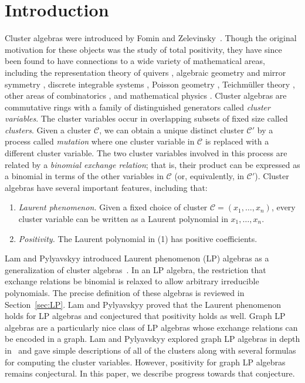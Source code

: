 \documentclass[pdftex]{sigma}
\numberwithin{equation}{section}
\newcommand{\calC}{\mathcal{C}}
\begin{document}
\section{Introduction}\label{sec:intro}
Cluster algebras were introduced by Fomin and Zelevinsky~\cite{FZ-02}. Though the original motivation for these objects was the study of total positivity, they have since been found to have connections to a wide variety of mathematical areas, including the representation theory of quivers \cite{BMRRT-06, K-10, R-10}, algebraic geometry and mirror symmetry \cite{B-17,GHK-15}, discrete integrable systems \cite{FH-13, K-10-II}, Poisson geometry \cite{GSV-05,GSV-10}, Teichm\"uller theory \cite{FG-09, FG-10, FT-18, GSV-05}, other areas of combinatorics \cite{BMDKTY-18,C-04, CFZ-02,IT-09}, and mathematical physics \cite{C-04,F-12}.
Cluster algebras are commutative rings with a family of distinguished generators called \emph{cluster variables}. The cluster variables occur in overlapping subsets of fixed size called \emph{clusters}. Given a cluster $\calC$, we can obtain a unique distinct cluster $\calC'$ by a process called \emph{mutation} where one cluster variable in $\calC$ is replaced with a different cluster variable. The two cluster variables involved in this process are related by a \emph{binomial exchange relation}; that is, their product can be expressed as a binomial in terms of the other variables in $\calC$ (or, equivalently, in $\calC'$).
Cluster algebras have several important features, including that:
\begin{enumerate}\itemsep=0pt
 \item[(1)] \emph{Laurent phenomenon.} Given a fixed choice of cluster $\calC=(x_1,\dots,x_n)$, every cluster vari\-able can be written as a Laurent polynomial in $x_1,\dots,x_n$.
 \item[(2)] \emph{Positivity.} The Laurent polynomial in (1) has positive coefficients.
\end{enumerate}
Lam and Pylyavskyy introduced Laurent phenomenon (LP) algebras as a generalization of cluster algebras~\cite{LP-12}. In an LP algebra, the restriction that exchange relations be binomial is relaxed to allow arbitrary irreducible polynomials. The precise definition of these algebras is reviewed in Section~\ref{sec:LP}. Lam and Pylyavskyy proved that the Laurent phenomenon holds for LP algebras and conjectured that positivity holds as well.
Graph LP algebras are a particularly nice class of LP algebras whose exchange relations can be encoded in a graph. Lam and Pylyavskyy explored graph LP algebras in depth in~\cite{LP-16} and gave simple descriptions of all of the clusters along with several formulas for computing the cluster variables. However, positivity for graph LP algebras remains conjectural. In this paper, we describe progress towards that conjecture.
\end{document}
